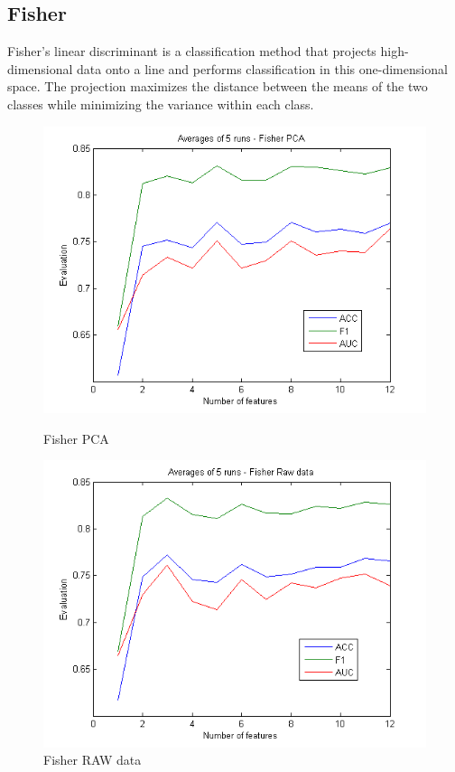 \documentclass[english, a4paper, 12pt]{article}
\newcommand{\tab}{\hspace*{2em}}
\begin{document}
\pagebreak
\subsection{Fisher}
\tab Fisher's linear discriminant is a classification method that projects high-dimensional data onto a line and performs classification in this one-dimensional space. The projection maximizes the distance between the means of the two classes while minimizing the variance within each class. \smallskip\\
\begin{figure}[H]
	\centering
	\begin{minipage}[b]{0.45\linewidth}
		\includegraphics[scale= 0.5]{fisher_pca.png}
		\caption{Fisher PCA}
		\label{fig:minipage1}
	\end{minipage}
	\quad	
	\begin{minipage}[b]{0.45\linewidth}
		\includegraphics[scale= 0.5]{fisher_raw_data.png}
		\caption{Fisher RAW data}
		\label{fig:minipage2}
	\end{minipage}
\end{figure}
\end{document}
